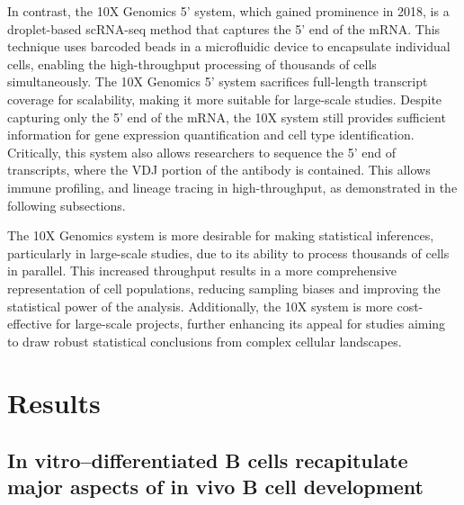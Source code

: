 In contrast, the 10X Genomics 5' system, which gained prominence in 2018, is a droplet-based scRNA-seq method that captures the 5' end of the mRNA. This technique uses barcoded beads in a microfluidic device to encapsulate individual cells, enabling the high-throughput processing of thousands of cells simultaneously. The 10X Genomics 5' system sacrifices full-length transcript coverage for scalability, making it more suitable for large-scale studies. Despite capturing only the 5' end of the mRNA, the 10X system still provides sufficient information for gene expression quantification and cell type identification. Critically, this system also allows researchers to sequence the 5' end of transcripts, where the VDJ portion of the antibody is contained. This allows immune profiling, and lineage tracing in high-throughput, as demonstrated in the following subsections. 

The 10X Genomics system is more desirable for making statistical inferences, particularly in large-scale studies, due to its ability to process thousands of cells in parallel. This increased throughput results in a more comprehensive representation of cell populations, reducing sampling biases and improving the statistical power of the analysis. Additionally, the 10X system is more cost-effective for large-scale projects, further enhancing its appeal for studies aiming to draw robust statistical conclusions from complex cellular landscapes.

\section{Results}

\subsection{In vitro–differentiated B cells recapitulate major aspects of in vivo B cell development}

